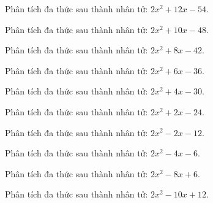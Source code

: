 \begin{bt}
	Phân tích đa thức sau thành nhân tử: $2 x^2 + 12 x - 54$.
\end{bt}
\begin{bt}
	Phân tích đa thức sau thành nhân tử: $2 x^2 + 10 x - 48$.
\end{bt}
\begin{bt}
	Phân tích đa thức sau thành nhân tử: $2 x^2 + 8 x - 42$.
\end{bt}
\begin{bt}
	Phân tích đa thức sau thành nhân tử: $2 x^2 + 6 x - 36$.
\end{bt}
\begin{bt}
	Phân tích đa thức sau thành nhân tử: $2 x^2 + 4 x - 30$.
\end{bt}
\begin{bt}
	Phân tích đa thức sau thành nhân tử: $2 x^2 + 2 x - 24$.
\end{bt}
\begin{bt}
	Phân tích đa thức sau thành nhân tử: $2 x^2 - 2 x - 12$.
\end{bt}
\begin{bt}
	Phân tích đa thức sau thành nhân tử: $2 x^2 - 4 x - 6$.
\end{bt}
\begin{bt}
	Phân tích đa thức sau thành nhân tử: $2 x^2 - 8 x + 6$.
\end{bt}
\begin{bt}
	Phân tích đa thức sau thành nhân tử: $2 x^2 - 10 x + 12$.
\end{bt}
